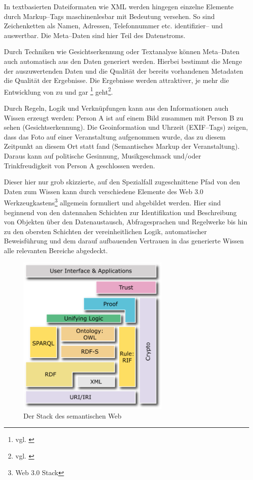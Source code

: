 In textbasierten Dateiformaten wie XML werden hingegen einzelne Elemente durch Markup--Tags maschinenlesbar mit Bedeutung versehen. So sind Zeichenketten als Namen, Adressen, Telefonnummer etc. identifizier-- und auswertbar. Die Meta--Daten sind hier Teil des Datenstroms.

Durch Techniken wie Gesichtserkennung oder Textanalyse können Meta--Daten auch automatisch aus den Daten generiert werden. Hierbei bestimmt die Menge der auszuwertenden Daten und die Qualität der bereits vorhandenen Metadaten die Qualität der Ergebnisse. Die Ergebnisse werden attraktiver, je mehr die Entwicklung von  zu  und gar \footnote{vgl. \cite{bigdikw}} geht\footnote{vgl. \cite{faz:inng}}.

Durch Regeln, Logik und Verknüpfungen kann aus den Informationen auch Wissen erzeugt werden:
Person A ist auf einem Bild zusammen mit Person B zu sehen (Gesichtserkennung). Die Geoinformation und Uhrzeit (EXIF--Tags) zeigen, dass das Foto auf einer Veranstaltung aufgenommen wurde, das zu diesem Zeitpunkt an diesem Ort statt fand (Semantisches Markup der Veranstaltung).
Daraus kann auf politische Gesinnung, Musikgeschmack und/oder Trinkfreudigkeit von Person A geschlossen werden.

Dieser hier nur grob skizzierte, auf den Spezialfall zugeschnittene Pfad von den Daten zum Wissen kann durch verschiedene Elemente des Web 3.0 Werkzeugkastens\footnote{Web 3.0 Stack} allgemein formuliert und abgebildet werden. Hier sind beginnend von den datennahen Schichten zur Identifikation und Beschreibung von Objekten über den Datenaustausch, Abfragesprachen und Regelwerke bis hin zu den obersten Schichten der vereinheitlichen Logik, automatischer Beweisführung und dem darauf aufbauenden Vertrauen in das generierte Wissen alle relevanten Bereiche abgedeckt.

\begin{figure}[H]
\begin{center}
\includegraphics[width=0.67\textwidth]{layerCake-4.png}
\caption[Der Stack des semantischen Web]{Der Stack des semantischen Web\protect\footnotemark}
\label{pic:tsemanticstack}
\end{center}
\end{figure}

